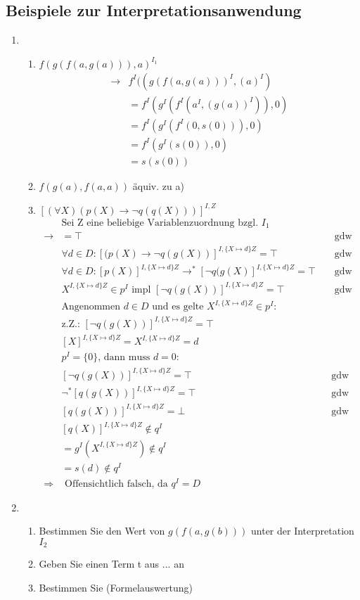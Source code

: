 \subsection{Beispiele zur Interpretationsanwendung}
\begin{enumerate}
	\item
	\begin{enumerate}
		\item \(f(g(f(a,g(a))),a)^{I_1}\)
		\begin{align*}
			\to &f^I((g(f(a,g(a)))^I,(a)^I) \\
			&= f^I(g^I(f^I(a^I,(g(a))^I)), 0)\\
			&= f^I(g^I(f^I(0,s(0))), 0)\\
			&= f^I(g^I(s(0)), 0)\\
			&= s(s(0))
		\end{align*}
		\item \(f(g(a),f(a,a))\) äquiv. zu a)
		\item \([(\forall X)(p(X)\to \neg q(q(X)))]^{I,Z}\)
		\begin{align*}
			&\text{Sei Z eine beliebige Variablenzuordnung bzgl. }I_1 \\
			\to & = \top &&\text{ gdw } \\
			& \forall d \in D : [(p(X)\to \neg q (g(X))]^{I,\{X \mapsto d \} Z} = \top &&\text{ gdw }\\
			& \forall d \in D : [p(X)]^{I,\{X \mapsto d \} Z} \to^* [\neg q (g(X)]^{I,\{X \mapsto d \} Z} = \top &&\text{ gdw}\\
			& X^{I,\{X \mapsto d \} Z} \in p^I \text{ impl } [\neg q (g(X))]^{I,\{X \mapsto d \} Z} = \top &&\text{ gdw}\\
			&\text{Angenommen }d\in D\text{ und es gelte } X^{I,\{X \mapsto d \} Z} \in p^I: \\
			&\text{z.Z.: } [\neg q(g(X))]^{I,\{X \mapsto d \} Z} = \top \\
			&[X]^{I,\{X \mapsto d \} Z} = X^{I,\{X \mapsto d \} Z} = d \\
			&p^I = \{0\}\text{, dann muss } d = 0: \\			
			&[\neg q(g(X))]^{I,\{X \mapsto d \} Z} = \top &&\text{gdw} \\
			&\neg^*[q(g(X))]^{I,\{X \mapsto d \} Z} = \top &&\text{gdw}\\
			&[q(g(X))]^{I,\{X \mapsto d \} Z} = \bot &&\text{gdw}\\
			&[q(X)]^{I,\{X \mapsto d \} Z} \notin q^I \\
			&= g^I(X^{I,\{X \mapsto d \} Z}) \notin q^I \\
			&= s(d) \notin q^I\\
			\Rightarrow &\text{ Offensichtlich falsch, da } q^I = D
		\end{align*}
	\end{enumerate}
	\item
	\begin{enumerate}
		\item Bestimmen Sie den Wert von \(g(f(a,g(b)))\) unter der Interpretation \(I_2\)
		\item Geben Sie einen Term t aus ... an
		\item Bestimmen Sie (Formelauswertung)
	\end{enumerate}
\end{enumerate}
